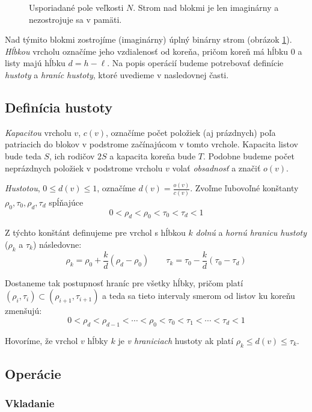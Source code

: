 \begin{figure}
    \centering
    \resizebox{0.8\textwidth}{!}{
        
    }
    \caption[Usporiadané pole]{Usporiadané pole veľkosti $N$. Strom nad blokmi je len imaginárny a nezostrojuje sa v pamäti.}
    \label{fig:of_overview}
\end{figure}

Nad týmito blokmi zostrojíme (imaginárny) úplný binárny strom (obrázok \ref{fig:of_overview}). \emph{Hĺbkou} vrcholu označíme jeho vzdialenosť od koreňa, pričom koreň má hĺbku $0$ a listy majú hĺbku $d = h-\ell$. Na popis operácií budeme potrebovať definície \emph{hustoty} a \emph{hraníc hustoty}, ktoré uvedieme v nasledovnej časti.

\subsection{Definícia hustoty}

\emph{Kapacitou} vrcholu $v$, $c(v)$, označíme počet položiek (aj prázdnych) poľa patriacich do blokov v podstrome začínajúcom v tomto vrchole. Kapacita listov bude teda $S$, ich rodičov $2S$ a kapacita koreňa bude $T$. Podobne budeme počet neprázdnych položiek v podstrome vrcholu $v$ volať \emph{obsadnosť} a značiť $o(v)$. 

\emph{Hustotou}, $0 \le d(v) \le 1$, označíme $d(v) = \frac{o(v)}{c(v)}$. Zvoľme ľubovoľné konštanty $\rho_0, \tau_0, \rho_d, \tau_d$ spĺňajúce
\[
0 < \rho_d < \rho_0 < \tau_0 < \tau_d < 1
\]

Z týchto konštánt definujeme pre vrchol s hĺbkou $k$ \emph{dolnú} a \emph{hornú hranicu hustoty} ($\rho_k$ a $\tau_k$) následovne:
\[
\rho_k = \rho_0 + \frac{k}{d}(\rho_d-\rho_0) \qquad
\tau_k = \tau_0 - \frac{k}{d}(\tau_0-\tau_d)
\]

Dostaneme tak postupnosť hraníc pre všetky hĺbky, pričom platí $(\rho_i,\tau_i) \subset (\rho_{i+1},\tau_{i+1})$ a teda sa tieto intervaly smerom od listov ku koreňu zmenšujú:
\[
0 < \rho_d < \rho_{d-1} < \cdots < \rho_0 < \tau_0 < \tau_1 < \cdots < \tau_d < 1
\]

Hovoríme, že vrchol $v$ hĺbky $k$ je \emph{v hraniciach} hustoty ak platí $\rho_k \le d(v) \le \tau_k$.

\subsection{Operácie}
\subsubsection{Vkladanie}

